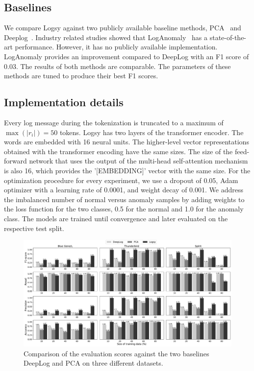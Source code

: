 \subsection{Baselines}
We compare Logsy against two publicly available baseline methods, PCA~\cite{xu2009detecting} and Deeplog~\cite{du2017deeplog}. Industry related studies showed that LogAnomaly~\cite{meng2019loganomaly} has a state-of-the-art performance. However, it has no publicly available implementation. LogAnomaly provides an improvement compared to DeepLog with an F1 score of 0.03. The results of both methods are comparable. The parameters of these methods are tuned to produce their best F1 scores.

\subsection{Implementation details}
Every log message during the tokenization is truncated to a maximum of $\max(\vert r_i \vert)=50$ tokens. Logsy has two layers of the transformer encoder. The words are embedded with 16 neural units. The higher-level vector representations obtained with the transformer encoding have the same sizes. The size of the feed-forward network that uses the output of the multi-head self-attention mechanism is also 16, which provides the '[EMBEDDING]' vector with the same size. For the optimization procedure for every experiment, we use a dropout of 0.05, Adam optimizer with a learning rate of 0.0001, and weight decay of 0.001. We address the imbalanced number of normal versus anomaly samples by adding weights to the loss function for the two classes, 0.5 for the normal and 1.0 for the anomaly class. The models are trained until convergence and later evaluated on the respective test split.




\begin{figure}[!t]
    \centering
    \includegraphics[width=1.0\textwidth]{gfx/chap4/results.pdf}
    \caption{Comparison of the evaluation scores against the two baselines DeepLog and PCA on three different datasets.}
    \label{fig:results}
\end{figure}


